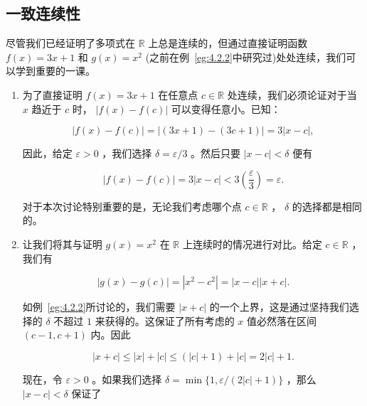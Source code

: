 \subsection{一致连续性}

尽管我们已经证明了多项式在 \(\mathbb{R}\) 上总是连续的，但通过直接证明函数 \(f\left( x\right)  = {3x} + 1\) 和 \(g\left( x\right)  = {x}^{2}\) (之前在例~\ref{eg:4.2.2}中研究过)处处连续，我们可以学到重要的一课。


\begin{Eg}
  \label{eg:4.4.4}
  \begin{enumerate}[label = (\roman*)]
  \item\label{item:4.4.1}
    为了直接证明 \(f\left( x\right)  = {3x} + 1\) 在任意点 \(c \in  \mathbb{R}\) 处连续，我们必须论证对于当 $x$ 趋近于 $c$ 时， \(\left| {f\left( x\right)  - f\left( c\right) }\right|\) 可以变得任意小。已知：

\[
\left| {f\left( x\right)  - f\left( c\right) }\right|  = \left| {\left( {{3x} + 1}\right)  - \left( {{3c} + 1}\right) }\right|  = 3\left| {x - c}\right| ,
\]

因此，给定 \(\varepsilon  > 0\) ，我们选择 \(\delta  = \varepsilon /3\) 。然后只要 \(\left| {x - c}\right|  < \delta\) 便有

\[
\left| {f\left( x\right)  - f\left( c\right) }\right|  = 3\left| {x - c}\right|  < 3\left( \frac{\varepsilon }{3}\right)  = \varepsilon .
\]

对于本次讨论特别重要的是，无论我们考虑哪个点 \(c \in  \mathbb{R}\) ， \(\delta\) 的选择都是相同的。
\item \label{item:4.4.2}让我们将其与证明 \(g\left( x\right)  = {x}^{2}\) 在 \(\mathbb{R}\) 上连续时的情况进行对比。给定 \(c \in  \mathbb{R}\) ，我们有

\[
\left| {g\left( x\right)  - g\left( c\right) }\right|  = \left| {{x}^{2} - {c}^{2}}\right|  = \left| {x - c}\right| \left| {x + c}\right| .
\]

如例~\ref{eg:4.2.2}所讨论的，我们需要 \(\left| {x + c}\right|\) 的一个上界，这是通过坚持我们选择的 \(\delta\) 不超过 $1$ 来获得的。这保证了所有考虑的 \(x\) 值必然落在区间 \(\left( {c - 1,c + 1}\right)\) 内。因此

\[
\left| {x + c}\right|  \leq  \left| x\right|  + \left| c\right|  \leq  \left( {\left| c\right|  + 1}\right)  + \left| c\right|  = 2\left| c\right|  + 1.
\]

现在，令 \(\varepsilon  > 0\) 。如果我们选择 \(\delta  = \min \{ 1,\varepsilon /\left( {2\left| c\right|  + 1}\right) \}\) ，那么 \(\left| {x - c}\right|  < \delta\) 保证了


\end{enumerate}
\end{Eg}

